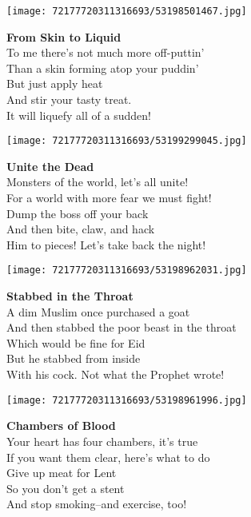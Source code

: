 \documentclass[10pt,letterpaper]{article}
\begin{document}
\begin{center}\texttt{[image: 72177720311316693/53198501467.jpg]}
\end{center}
\begin{center}
\textbf{From Skin to Liquid}\\
\vskip 0.2in
To me there's not much more off-puttin'\\
Than a skin forming atop your puddin'\\
But just apply heat\\
And stir your tasty treat.\\
It will liquefy all of a sudden!\\
\end{center}
\pagebreak

\begin{center}\texttt{[image: 72177720311316693/53199299045.jpg]}
\end{center}
\begin{center}
\textbf{Unite the Dead}\\
\vskip 0.2in
Monsters of the world, let's all unite!\\
For a world with more fear we must fight!\\
Dump the boss off your back\\
And then bite, claw, and hack\\
Him to pieces!  Let's take back the night!\\
\end{center}
\pagebreak

\begin{center}\texttt{[image: 72177720311316693/53198962031.jpg]}
\end{center}
\begin{center}
\textbf{Stabbed in the Throat}\\
\vskip 0.2in
A dim Muslim once purchased a goat\\
And then stabbed the poor beast in the throat\\
Which would be fine for Eid\\
But he stabbed from inside\\
With his cock.  Not what the Prophet wrote!\\
\end{center}
\pagebreak

\begin{center}\texttt{[image: 72177720311316693/53198961996.jpg]}
\end{center}
\begin{center}
\textbf{Chambers of Blood}\\
\vskip 0.2in
Your heart has four chambers, it's true\\
If you want them clear, here's what to do\\
Give up meat for Lent\\
So you don't get a stent\\
And stop smoking--and exercise, too!\\
\end{center}
\pagebreak
\end{document}
